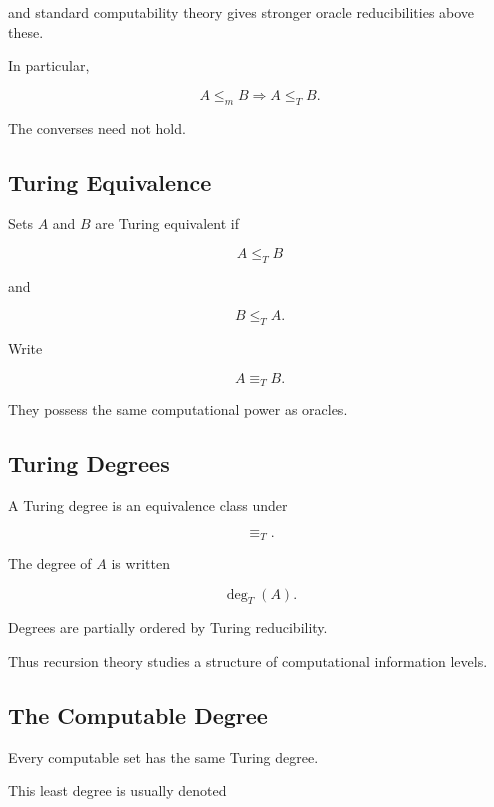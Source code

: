 and standard computability theory gives stronger oracle reducibilities above
these.

In particular,

\[
\boxed{
A\leq_mB
\Longrightarrow
A\leq_TB.
}
\]

The converses need not hold.

\subsection{Turing Equivalence}
\label{subsec:turing-equivalence}

Sets \(A\) and \(B\) are Turing equivalent if

\[
\boxed{
A\leq_TB
}
\]

and

\[
\boxed{
B\leq_TA.
}
\]

Write

\[
\boxed{
A\equiv_TB.
}
\]

They possess the same computational power as oracles.

\subsection{Turing Degrees}
\label{subsec:turing-degrees}

A Turing degree is an equivalence class under

\[
\equiv_T.
\]

The degree of \(A\) is written

\[
\boxed{
\deg_T(A).
}
\]

Degrees are partially ordered by Turing reducibility.

Thus recursion theory studies a structure of computational information
levels.

\subsection{The Computable Degree}
\label{subsec:computable-degree}

Every computable set has the same Turing degree.

This least degree is usually denoted

